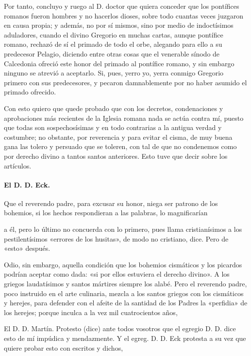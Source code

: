 Por tanto, concluyo y ruego al D. doctor que quiera conceder que los pontífices romanos fueron hombres y no hacerlos dioses, sobre todo cuantas veces juzgaron en causa propia; y además, no por sí mismos, sino por medio de indoctísimos aduladores, cuando el divino Gregorio en muchas cartas, aunque pontífice romano, rechazó de sí el primado de todo el orbe, alegando para ello a su predecesor Pelagio, diciendo entre otras cosas que el venerable sínodo de Calcedonia ofreció este honor del primado al pontífice romano, y sin embargo ninguno se atrevió a aceptarlo. Si, pues, yerro yo, yerra conmigo Gregorio primero con sus predecesores, y pecaron damnablemente por no haber asumido el primado ofrecido.

Con esto quiero que quede probado que con los decretos, condenaciones y aprobaciones más recientes de la Iglesia romana nada se actúa contra mí, puesto que todas son sospechosísimas y en todo contrarias a la antigua verdad y costumbre; no obstante, por reverencia y para evitar el cisma, de muy buena gana las tolero y persuado que se toleren, con tal de que no condenemos como por derecho divino a tantos santos anteriores. Esto tuve que decir sobre los artículos.

\paragraph*{El D. D. Eck.}

Que el reverendo padre, para excusar su honor, niega ser patrono de los bohemios, si los hechos respondieran a las palabras, lo magnificarían

a él, pero lo último no concuerda con lo primero, pues llama cristianísimos a los pestilentísimos «errores de los husitas», de modo no cristiano, dice. Pero de «esto» después.

Odio, sin embargo, aquella condición que los bohemios cismáticos y los picardos podrían aceptar como dada: «si por ellos estuviera el derecho divino». A los griegos laudatísimos y santos mártires siempre los alabé. Pero el reverendo padre, poco instruido en el arte culinaria, mezcla a los santos griegos con los cismáticos y herejes, para defender con el afeite de la santidad de los Padres la «perfidia» de los herejes; porque inculca a la vez mil cuatrocientos años,

El D. D. Martín. Protesto (dice) ante todos vosotros que el egregio D. D. dice esto de mí impúdica y mendazmente. Y el egreg. D. D. Eck protesta a su vez que quiere probar esto con escritos y dichos,

